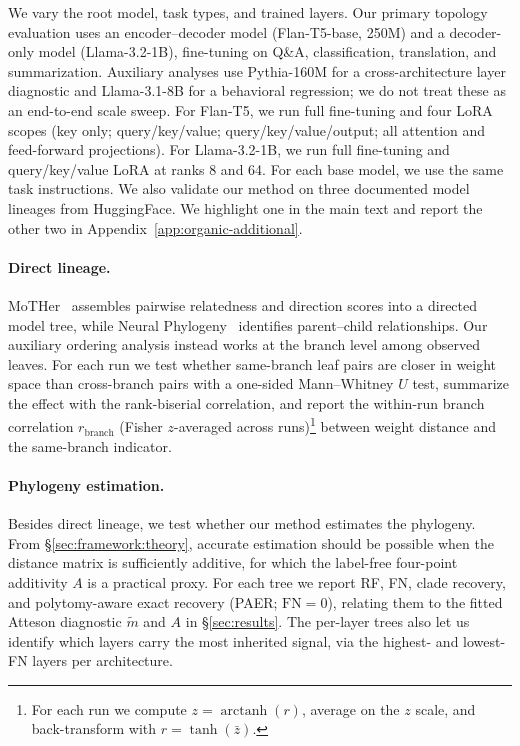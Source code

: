 \documentclass{article}
\theoremstyle{definition}
\theoremstyle{plain}
\begin{document}
We vary the root model, task types, and trained layers. Our primary topology evaluation uses an
encoder--decoder model (Flan-T5-base, 250M) and a decoder-only model (Llama-3.2-1B), fine-tuning on
Q\&A, classification, translation, and summarization. Auxiliary analyses use Pythia-160M for a
cross-architecture layer diagnostic and Llama-3.1-8B for a behavioral regression; we do not treat
these as an end-to-end scale sweep. For Flan-T5, we run full fine-tuning and four LoRA \citep{hu2022lora}
scopes (key only; query/key/value; query/key/value/output; all attention and feed-forward projections).
For Llama-3.2-1B, we run full fine-tuning and query/key/value LoRA at ranks 8 and 64. For each base
model, we use the same task instructions. We also
validate our method on three documented model lineages from HuggingFace. We highlight one in the
main text and report the other two in Appendix~\ref{app:organic-additional}.

\paragraph{Direct lineage.}
MoTHer~\citep{horwitz2025mother} assembles pairwise relatedness and direction scores into a directed
model tree, while Neural Phylogeny~\citep{yu2025neural} identifies parent--child relationships. Our
auxiliary ordering analysis instead works at the branch level among observed leaves. For each run we test whether same-branch leaf pairs are closer in weight space than cross-branch pairs with a one-sided Mann--Whitney $U$ test, summarize the effect with the rank-biserial correlation, and report the within-run branch correlation $r_{\mathrm{branch}}$ (Fisher $z$-averaged across runs)\footnote{For each run we compute $z=\operatorname{arctanh}(r)$, average on the $z$ scale, and back-transform with $r=\tanh(\bar z)$.} between weight distance and the same-branch indicator.

\paragraph{Phylogeny estimation.}
\label{sec:exp:weights}
Besides direct lineage, we test whether our method estimates the phylogeny. From \S\ref{sec:framework:theory}, accurate estimation should be possible when the distance matrix is sufficiently additive, for which the label-free four-point additivity $A$ is a practical proxy. For each tree we report RF, FN, clade recovery, and polytomy-aware exact recovery (PAER; $\mathrm{FN}=0$), relating them to the fitted Atteson diagnostic $\widetilde m$ and $A$ in \S\ref{sec:results}. The per-layer trees also let us identify which layers carry the most inherited signal, via the highest- and lowest-FN layers per architecture.
\end{document}
